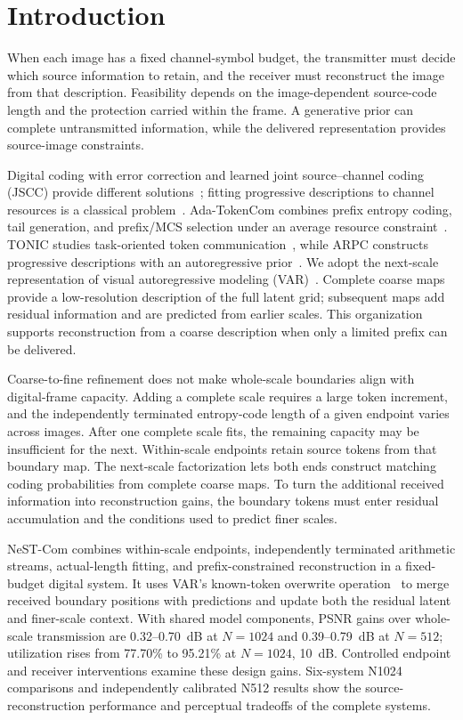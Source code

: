 \section{Introduction}
When each image has a fixed channel-symbol budget, the transmitter must decide which source information to retain, and the receiver must reconstruct the image from that description. Feasibility depends on the image-dependent source-code length and the protection carried within the frame. A generative prior can complete untransmitted information, while the delivered representation provides source-image constraints.

Digital coding with error correction and learned joint source--channel coding (JSCC) provide different solutions~\cite{deepjscc,swinjscc}; fitting progressive descriptions to channel resources is a classical problem~\cite{chande}. Ada-TokenCom combines prefix entropy coding, tail generation, and prefix/MCS selection under an average resource constraint~\cite{adatokencom}. TONIC studies task-oriented token communication~\cite{tonic}, while ARPC constructs progressive descriptions with an autoregressive prior~\cite{arpc}. We adopt the next-scale representation of visual autoregressive modeling (VAR)~\cite{var}. Complete coarse maps provide a low-resolution description of the full latent grid; subsequent maps add residual information and are predicted from earlier scales. This organization supports reconstruction from a coarse description when only a limited prefix can be delivered.

Coarse-to-fine refinement does not make whole-scale boundaries align with digital-frame capacity. Adding a complete scale requires a large token increment, and the independently terminated entropy-code length of a given endpoint varies across images. After one complete scale fits, the remaining capacity may be insufficient for the next. Within-scale endpoints retain source tokens from that boundary map. The next-scale factorization lets both ends construct matching coding probabilities from complete coarse maps. To turn the additional received information into reconstruction gains, the boundary tokens must enter residual accumulation and the conditions used to predict finer scales.

NeST-Com combines within-scale endpoints, independently terminated arithmetic streams, actual-length fitting, and prefix-constrained reconstruction in a fixed-budget digital system. It uses VAR's known-token overwrite operation~\cite{var} to merge received boundary positions with predictions and update both the residual latent and finer-scale context. With shared model components, PSNR gains over whole-scale transmission are 0.32--0.70~dB at $N=1024$ and 0.39--0.79~dB at $N=512$; utilization rises from 77.70\% to 95.21\% at $N=1024$, 10~dB. Controlled endpoint and receiver interventions examine these design gains. Six-system N1024 comparisons and independently calibrated N512 results show the source-reconstruction performance and perceptual tradeoffs of the complete systems.
